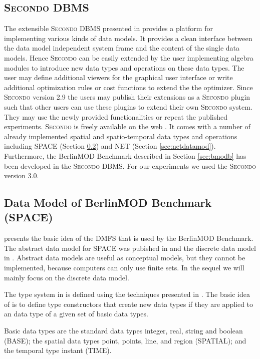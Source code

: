 \documentclass[a4paper]{article}
\newcommand{\secondo}{\textsc{Secondo}}
\newcommand{\bmodb} {BerlinMOD Benchmark}
\begin{document}
\subsection{\secondo{} DBMS}
\label{sec:secondo}
The extensible \secondo{} DBMS presented in
\cite{SecondoEnvironmentDieker,SecondoPlatformPrototypingGueting} provides a
platform for implementing various kinds of data models. It provides a clean
interface between the data model independent system frame and the content of the
single data models. Hence \secondo{} can be easily extended by the user
implementing algebra modules to introduce new data types and operations on
these data types. The user may define additional viewers for the graphical user
interface or write additional optimization rules or cost functions to extend the
the optimizer. Since \secondo{} version 2.9 the users may publish their extensions
as a \secondo{} plugin such that other users can use these plugins to extend
their own
\secondo{} system. They may use the newly provided functionalities or repeat the
published experiments. \secondo{} is freely available on the web \cite{secondoweb}.
It comes with a number of already implemented spatial and spatio-temporal data types
and operations including SPACE (Section \ref{sec:bmodbdatamod}) and NET
(Section \ref{sec:netdatamod}). Furthermore, the \bmodb{}
described in Section \ref{sec:bmodb} has been developed in the \secondo{} DBMS.
For our experiments we used the \secondo{} version 3.0.
\subsection{Data Model of \bmodb{} (SPACE)}
\label{sec:bmodbdatamod}
\cite{STDTModelingQueryingMOinDErwig} presents the basic idea of the DMFS that
is used by the \bmodb{}. The abstract data model for SPACE was pubished in
\cite{RepresentingMovingObjectsGueting} and the discrete data model in
\cite{DataModelDataStructureGueting}. Abstract data models are useful as conceptual
models, but they cannot be implemented, because computers can only use finite sets.
In the sequel we will mainly focus on the discrete data model.

The type system in \cite{RepresentingMovingObjectsGueting} is defined using the
techniques presented in \cite{SecondOrderSignatureGueting}. The basic idea of
\cite{RepresentingMovingObjectsGueting} is to define type constructors
that create new data types if they are applied to an data type of a given set of
basic data types.

Basic data types are the standard data types integer, real, string and boolean
(BASE);
the spatial data types point, points, line, and region (SPATIAL);
and the temporal type instant (TIME).
\end{document}
